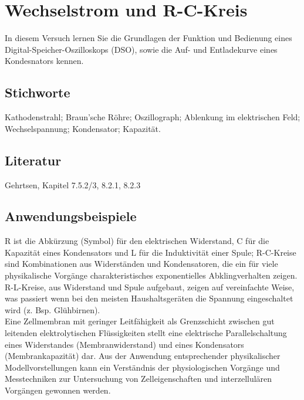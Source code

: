 \chapter{Wechselstrom und R-C-Kreis}
\label{v:15}

In diesem Versuch lernen Sie die Grundlagen der Funktion und Bedienung eines Digital-Speicher-Oszilloskops (DSO), sowie die Auf- und Entladekurve eines Kondesnators kennen.

\section{Stichworte}

Kathodenstrahl; Braun'sche Röhre; Oszillograph; Ablenkung im elektrischen Feld; Wechselspannung; Kondensator; Kapazität.
%
\section{Literatur}

Gehrtsen, Kapitel 7.5.2/3, 8.2.1, 8.2.3
%
\section{Anwendungsbeispiele}

R ist die Abkürzung (Symbol) für den elektrischen Widerstand, C für die Kapazität eines Kondensators und L für die Induktivität einer Spule; R-C-Kreise sind Kombinationen aus Widerständen und Kondensatoren, die ein für viele physikalische Vorgänge charakteristisches exponentielles Abklingverhalten zeigen. R-L-Kreise, aus Widerstand und Spule aufgebaut, zeigen auf vereinfachte Weise, was passiert wenn bei den meisten Haushaltsgeräten die Spannung eingeschaltet wird (z. Bsp. Glühbirnen).\\

Eine Zellmembran mit geringer Leitfähigkeit als Grenzschicht zwischen gut leitenden elektrolytischen Flüssigkeiten stellt eine elektrische Parallelschaltung eines Widerstandes (Membranwiderstand) und eines Kondensators (Membrankapazität) dar. Aus der Anwendung entsprechender physikalischer Modellvorstellungen kann ein Verständnis der physiologischen Vorgänge und Messtechniken zur Untersuchung von Zelleigenschaften und interzellulären Vorgängen gewonnen werden.

